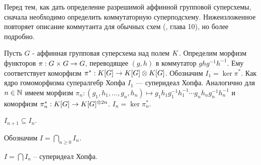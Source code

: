 Перед тем, как дать определение разрешимой аффинной групповой суперсхемы,
сначала необходимо определить коммутаторную суперподсхему. Нижеизложенное
повторяет описание коммутанта для обычных схем (\cite{waterhouse}, глава 10),
но более подробно.

Пусть $ G $ - аффинная групповая суперсхема над полем $ K $.
Определим морфизм функторов $ \pi: G \times G \to G $, переводящее
$ (g, h) $ в коммутатор $ g h g^{-1} h^{-1} $. Ему соответствует коморфизм
$ \pi^*: K[G] \to K[G] \otimes K[G] $. Обозначим $ I_1 = \ker\pi^* $.
Как ядро гомоморфизма супералгебр Хопфа $ I_1 $ --- суперидеал Хопфа.
Аналогично для $ n \in \mathbb{N} $ имеем морфизм
$ \pi_n: (g_1, h_1, \ldots, g_n, h_n) \mapsto g_1 h_1 g_1^{-1} h_1^{-1} \cdots g_n h_n g_n^{-1} h_n^{-1} $
и коморфизм $ \pi_n^*: K[G] \to K[G]^{\otimes 2n} $. $ I_n = \ker\pi_n^* $.

\begin{proposition}
  $ I_{n+1} \subseteq I_{n} $.
\end{proposition}

Обозначим $ I = \bigcap_{n \geqslant 0} I_n $.

\begin{proposition}
  $ I = \bigcap I_n $ -- суперидеал Хопфа.
\end{proposition}

